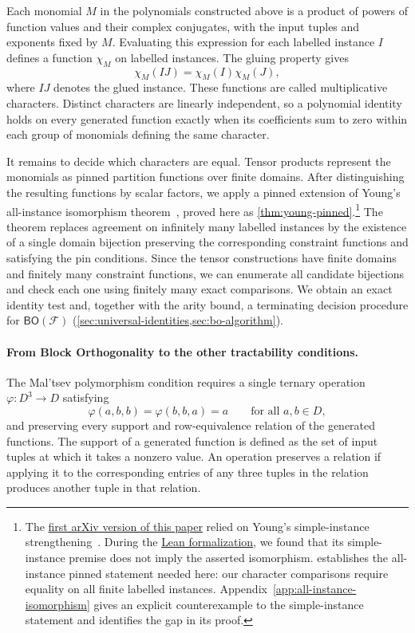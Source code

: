 \documentclass[11pt,letterpaper,onecolumn]{article}
\theoremstyle{plain}
\theoremstyle{definition}
\theoremstyle{remark}
\newcommand{\cF}{\mathcal F}
\newcommand{\BO}{\mathsf{BO}}
\begin{document}
Each monomial $M$ in the polynomials constructed above is a product of
powers of function values and their complex conjugates, with the input
tuples and exponents fixed by $M$.  Evaluating this expression for each
labelled instance $I$ defines a function $\chi_M$ on labelled instances.
The gluing property gives
\[
  \chi_M(IJ)=\chi_M(I)\chi_M(J),
\]
where $IJ$ denotes the glued instance.  These functions are called
multiplicative characters.  Distinct characters are linearly independent,
so a polynomial identity holds on every generated function exactly when
its coefficients sum to zero within each group of monomials defining the
same character.

It remains to decide which characters are equal.  Tensor products represent
the monomials as pinned partition functions over finite domains.  After
distinguishing the resulting functions by scalar factors, we apply a pinned
extension of Young's all-instance isomorphism
theorem~\cite[Theorem~8]{Young2025}, proved here as
\cref{thm:young-pinned}.\footnote{The
\href{https://arxiv.org/abs/2608.14845v1}{first arXiv version of this paper}
relied on Young's simple-instance strengthening~\cite[Corollary~35]{Young2025}.
During the \href{https://github.com/liuchliuch/complex-csp-decidability-lean}{Lean formalization}, we found that its simple-instance premise
does not imply the asserted isomorphism.   establishes
the all-instance pinned statement needed here: our character comparisons
require equality on all finite labelled instances.
Appendix~\ref{app:all-instance-isomorphism} gives an explicit counterexample
to the simple-instance statement and identifies the gap in its proof.}
The theorem replaces agreement on infinitely many labelled instances by
the existence of a single domain bijection preserving the corresponding
constraint functions and satisfying the pin conditions.  Since the tensor
constructions have finite domains and finitely many constraint functions,
we can enumerate all candidate bijections and check each one using finitely
many exact comparisons.  We obtain an exact identity test and, together
with the arity bound, a terminating decision procedure for $\BO(\cF)$
(\cref{sec:universal-identities,sec:bo-algorithm}).

\paragraph{From Block Orthogonality to the other tractability conditions.}
The Mal'tsev polymorphism condition requires a single ternary operation
$\varphi:D^3\to D$ satisfying
\[
  \varphi(a,b,b)=\varphi(b,b,a)=a
  \qquad\text{for all }a,b\in D,
\]
and preserving every support and row-equivalence relation of the generated
functions.  The support of a generated function is defined as the set of
input tuples at which it takes a nonzero value.  An operation preserves a
relation if applying it to the corresponding entries of any three tuples
in the relation produces another tuple in that relation.
\end{document}
